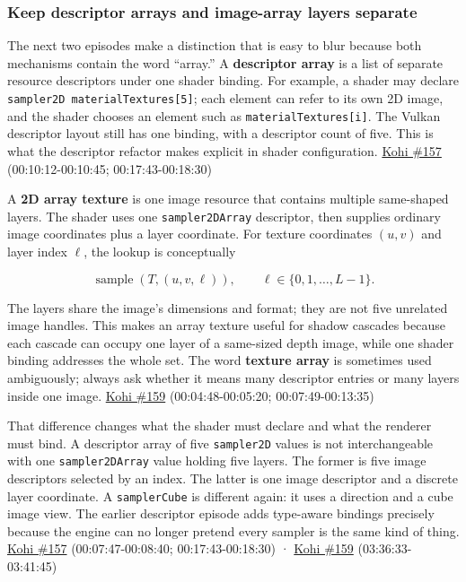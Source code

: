 \subsubsection{Keep descriptor arrays and image-array layers separate}\label{keep-descriptor-arrays-and-image-array-layers-separate}

The next two episodes make a distinction that is easy to blur because both mechanisms contain the word ``array.'' A \textbf{descriptor array} is a list of separate resource descriptors under one shader binding. For example, a shader may declare \texttt{sampler2D\ materialTextures{[}5{]}}; each element can refer to its own 2D image, and the shader chooses an element such as \texttt{materialTextures{[}i{]}}. The Vulkan descriptor layout still has one binding, with a descriptor count of five. This is what the descriptor refactor makes explicit in shader configuration. \href{https://www.youtube.com/watch?v=ZmZUmsqUN6Q}{Kohi \#157} (00:10:12-00:10:45; 00:17:43-00:18:30)

A \textbf{2D array texture} is one image resource that contains multiple same-shaped layers. The shader uses one \texttt{sampler2DArray} descriptor, then supplies ordinary image coordinates plus a layer coordinate. For texture coordinates \((u,v)\) and layer index \(\ell\), the lookup is conceptually

\[\operatorname{sample}(T,(u,v,\ell)),\qquad \ell\in\{0,1,\ldots,L-1\}.\]

The layers share the image's dimensions and format; they are not five unrelated image handles. This makes an array texture useful for shadow cascades because each cascade can occupy one layer of a same-sized depth image, while one shader binding addresses the whole set. The word \textbf{texture array} is sometimes used ambiguously; always ask whether it means many descriptor entries or many layers inside one image. \href{https://www.youtube.com/watch?v=FrtHF-9K1HI}{Kohi \#159} (00:04:48-00:05:20; 00:07:49-00:13:35)

That difference changes what the shader must declare and what the renderer must bind. A descriptor array of five \texttt{sampler2D} values is not interchangeable with one \texttt{sampler2DArray} value holding five layers. The former is five image descriptors selected by an index. The latter is one image descriptor and a discrete layer coordinate. A \texttt{samplerCube} is different again: it uses a direction and a cube image view. The earlier descriptor episode adds type-aware bindings precisely because the engine can no longer pretend every sampler is the same kind of thing. \href{https://www.youtube.com/watch?v=ZmZUmsqUN6Q}{Kohi \#157} (00:07:47-00:08:40; 00:17:43-00:18:30) · \href{https://www.youtube.com/watch?v=FrtHF-9K1HI}{Kohi \#159} (03:36:33-03:41:45)

